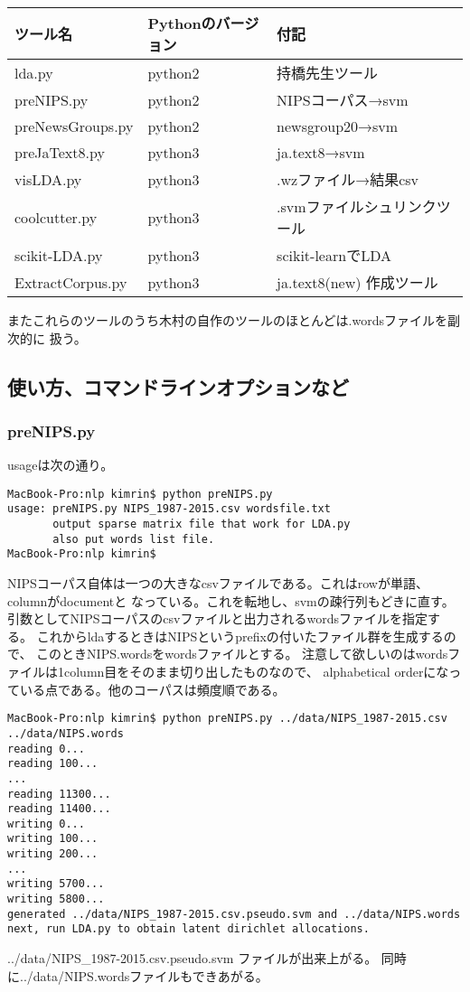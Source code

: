 \documentclass[uplatex]{jsarticle}
\begin{document}
\begin{table}[htb]
\begin{tabular}{|l||l|l|} \hline
ツール名 & Pythonのバージョン & 付記 \\ \hline \hline
lda.py & python2 & 持橋先生ツール \\ \hline \hline
preNIPS.py & python2 & NIPSコーパス→svm \\ \hline
preNewsGroups.py & python2 & newsgroup20→svm \\ \hline
preJaText8.py & python3 & ja.text8→svm \\ \hline
visLDA.py & python3 & .wzファイル→結果csv \\ \hline
coolcutter.py & python3 & .svmファイルシュリンクツール \\ \hline
scikit-LDA.py & python3 & scikit-learnでLDA \\ \hline \hline
ExtractCorpus.py & python3 & ja.text8(new) 作成ツール \\ \hline
\end{tabular}
\end{table}
またこれらのツールのうち木村の自作のツールのほとんどは.wordsファイルを副次的に
扱う。

\subsection{使い方、コマンドラインオプションなど}
\subsubsection{preNIPS.py}

usageは次の通り。
\begin{lstlisting}
MacBook-Pro:nlp kimrin$ python preNIPS.py
usage: preNIPS.py NIPS_1987-2015.csv wordsfile.txt
       output sparse matrix file that work for LDA.py
       also put words list file.
MacBook-Pro:nlp kimrin$
\end{lstlisting}
NIPSコーパス自体は一つの大きなcsvファイルである。これはrowが単語、columnがdocumentと
なっている。これを転地し、svmの疎行列もどきに直す。
引数としてNIPSコーパスのcsvファイルと出力されるwordsファイルを指定する。
これからldaするときはNIPSというprefixの付いたファイル群を生成するので、
このときNIPS.wordsをwordsファイルとする。
注意して欲しいのはwordsファイルは1column目をそのまま切り出したものなので、
alphabetical orderになっている点である。他のコーパスは頻度順である。

\begin{lstlisting}
MacBook-Pro:nlp kimrin$ python preNIPS.py ../data/NIPS_1987-2015.csv ../data/NIPS.words
reading 0...
reading 100...
...
reading 11300...
reading 11400...
writing 0...
writing 100...
writing 200...
...
writing 5700...
writing 5800...
generated ../data/NIPS_1987-2015.csv.pseudo.svm and ../data/NIPS.words
next, run LDA.py to obtain latent dirichlet allocations.
\end{lstlisting}
../data/NIPS\_1987-2015.csv.pseudo.svm ファイルが出来上がる。
同時に../data/NIPS.wordsファイルもできあがる。
\end{document}
